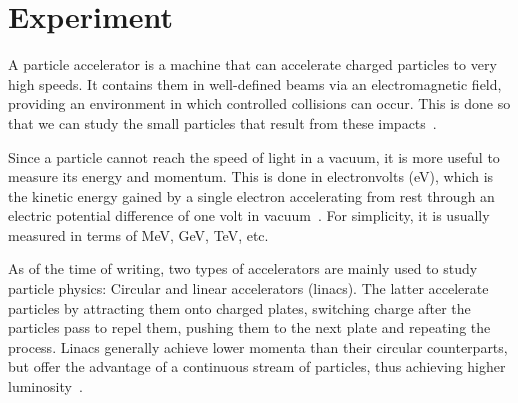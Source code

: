 \section{Experiment} \label{sec::experiment}
A particle accelerator is a machine that can accelerate charged particles to very high speeds.
It contains them in well-defined beams via an electromagnetic field, providing an environment in which controlled collisions can occur.
This is done so that we can study the small particles that result from these impacts~\cite{leduff2005longitudinal}.

Since a particle cannot reach the speed of light in a vacuum, it is more useful to measure its energy and momentum.
This is done in electronvolts (eV), which is the kinetic energy gained by a single electron accelerating from rest through an electric potential difference of one volt in vacuum~\cite{codata2015ev}.
For simplicity, it is usually measured in terms of MeV, GeV, TeV, etc.

As of the time of writing, two types of accelerators are mainly used to study particle physics:
Circular and linear accelerators (linacs).
The latter accelerate particles by attracting them onto charged plates, switching charge after the particles pass to repel them, pushing them to the next plate and repeating the process.
Linacs generally achieve lower momenta than their circular counterparts, but offer the advantage of a continuous stream of particles, thus achieving higher luminosity~\cite{pinchoff2005introduction}.




